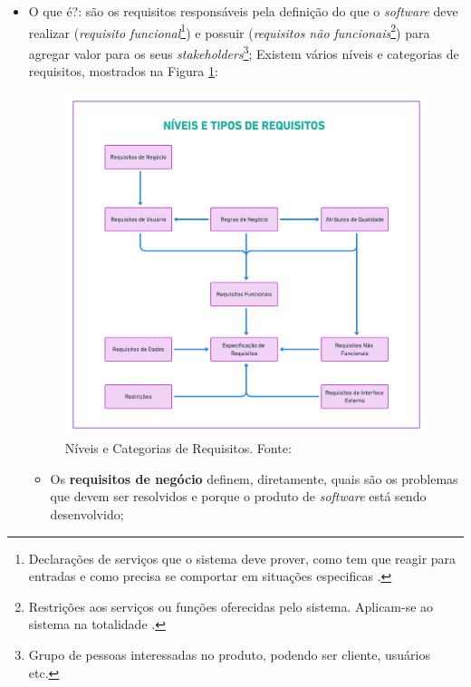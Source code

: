 \begin{itemize}
    \item O que é?: são os requisitos responsáveis pela definição do que o \textit{software} deve realizar (\textit{requisito funcional}\footnote{Declarações de serviços que o sistema deve prover, como tem que reagir para entradas e como precisa se comportar em situações especificas \cite{Sommerville10}.}) e possuir (\textit{requisitos não funcionais}\footnote{Restrições aos serviços ou funções oferecidas pelo sistema. Aplicam-se ao sistema na totalidade \cite{Sommerville10}.}) para agregar valor para os seus \textit{stakeholders}\footnote{Grupo de pessoas interessadas no produto, podendo ser cliente, usuários etc.}; Existem vários níveis e categorias de requisitos, mostrados na Figura \ref{lev_tipo_req}:
    
    \begin{figure}[htb]
        \begin{center}
            \includegraphics[width=12cm, height=10cm, keepaspectratio]{figuras/Introducao/lev_tipo_req.png}
            \caption{{Níveis e Categorias de Requisitos. Fonte: \cite{westfall_5w2h}}}
            \label{lev_tipo_req}
        \end{center}
    \end{figure}
    
    \begin{itemize}
    
        \item Os \textbf{requisitos de negócio} definem, diretamente, quais são os problemas que devem ser resolvidos e porque o produto de \textit{software} está sendo desenvolvido;
        

\end{itemize}
\end{itemize}
